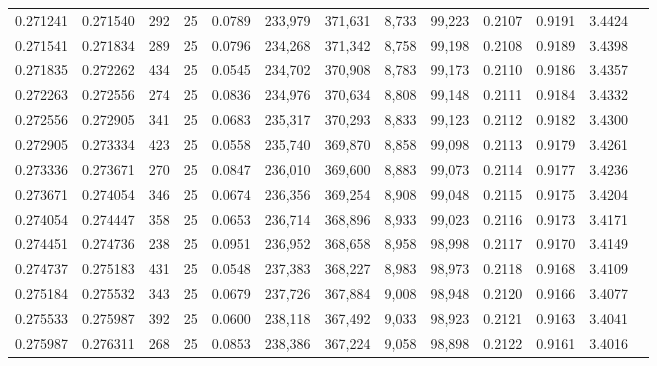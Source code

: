 \begin{tabular}{rrrrrrrrrrrrr}
0.271241 & 0.271540 &   292 &  25 &                                     0.0789 & 233,979 & 371,631 &   8,733 &  99,223 & 0.2107 & 0.9191 & 3.4424 \\
0.271541 & 0.271834 &   289 &  25 &                                     0.0796 & 234,268 & 371,342 &   8,758 &  99,198 & 0.2108 & 0.9189 & 3.4398 \\
0.271835 & 0.272262 &   434 &  25 &                                     0.0545 & 234,702 & 370,908 &   8,783 &  99,173 & 0.2110 & 0.9186 & 3.4357 \\
0.272263 & 0.272556 &   274 &  25 &                                     0.0836 & 234,976 & 370,634 &   8,808 &  99,148 & 0.2111 & 0.9184 & 3.4332 \\
0.272556 & 0.272905 &   341 &  25 &                                     0.0683 & 235,317 & 370,293 &   8,833 &  99,123 & 0.2112 & 0.9182 & 3.4300 \\
0.272905 & 0.273334 &   423 &  25 &                                     0.0558 & 235,740 & 369,870 &   8,858 &  99,098 & 0.2113 & 0.9179 & 3.4261 \\
0.273336 & 0.273671 &   270 &  25 &                                     0.0847 & 236,010 & 369,600 &   8,883 &  99,073 & 0.2114 & 0.9177 & 3.4236 \\
0.273671 & 0.274054 &   346 &  25 &                                     0.0674 & 236,356 & 369,254 &   8,908 &  99,048 & 0.2115 & 0.9175 & 3.4204 \\
0.274054 & 0.274447 &   358 &  25 &                                     0.0653 & 236,714 & 368,896 &   8,933 &  99,023 & 0.2116 & 0.9173 & 3.4171 \\
0.274451 & 0.274736 &   238 &  25 &                                     0.0951 & 236,952 & 368,658 &   8,958 &  98,998 & 0.2117 & 0.9170 & 3.4149 \\
0.274737 & 0.275183 &   431 &  25 &                                     0.0548 & 237,383 & 368,227 &   8,983 &  98,973 & 0.2118 & 0.9168 & 3.4109 \\
0.275184 & 0.275532 &   343 &  25 &                                     0.0679 & 237,726 & 367,884 &   9,008 &  98,948 & 0.2120 & 0.9166 & 3.4077 \\
0.275533 & 0.275987 &   392 &  25 &                                     0.0600 & 238,118 & 367,492 &   9,033 &  98,923 & 0.2121 & 0.9163 & 3.4041 \\
0.275987 & 0.276311 &   268 &  25 &                                     0.0853 & 238,386 & 367,224 &   9,058 &  98,898 & 0.2122 & 0.9161 & 3.4016 \\

\end{tabular}
